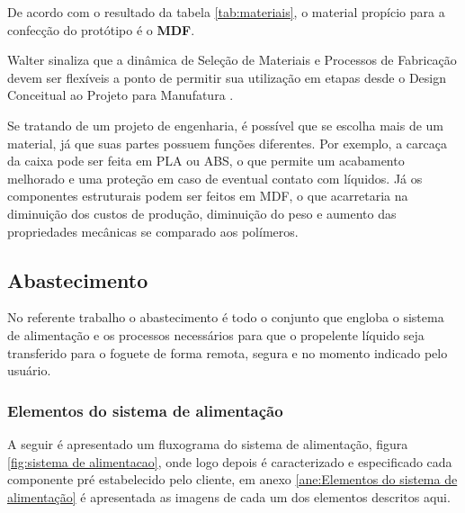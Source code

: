 \par De acordo com o resultado da tabela \ref{tab:materiais}, o material propício para a confecção do protótipo é o \textbf{MDF}.

\par Walter sinaliza que a dinâmica de Seleção de Materiais e Processos de Fabricação devem ser flexíveis a ponto de permitir sua utilização em etapas desde o Design Conceitual ao Projeto para Manufatura \cite{walterconteudo}. 

\par Se tratando de um projeto de engenharia, é possível que se escolha mais de um material, já que suas partes possuem funções diferentes. Por exemplo, a carcaça da caixa pode ser feita em PLA ou ABS, o que permite um acabamento melhorado e uma proteção em caso de eventual contato com líquidos. Já os componentes estruturais podem ser feitos em MDF, o que acarretaria na diminuição dos custos de produção, diminuição do peso e aumento das propriedades mecânicas se comparado aos polímeros.

\subsection{Abastecimento}

\par No referente trabalho o abastecimento é todo o conjunto que engloba o sistema de alimentação e os processos necessários para que o propelente líquido seja transferido para o foguete de forma remota, segura e no momento indicado pelo usuário.

\subsubsection{Elementos do sistema de alimentação}

\par A seguir é apresentado um fluxograma do sistema de alimentação, figura \ref{fig:sistema de alimentacao}, onde logo depois é caracterizado e especificado cada componente pré estabelecido pelo cliente, em anexo \ref{ane:Elementos do sistema de alimentação} é apresentada as imagens de cada um dos elementos descritos aqui.

